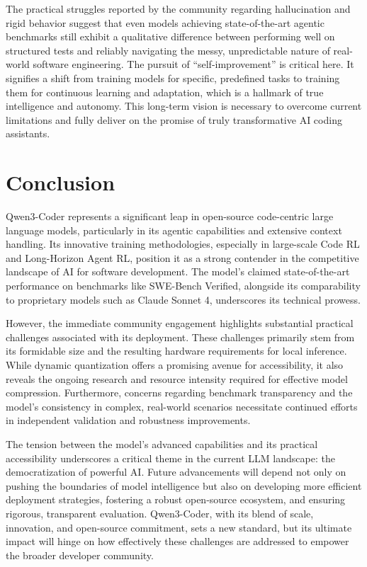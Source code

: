 The practical struggles reported by the community regarding hallucination and rigid behavior suggest that even models achieving state-of-the-art agentic benchmarks still exhibit a qualitative difference between performing well on structured tests and reliably navigating the messy, unpredictable nature of real-world software engineering.\cite{reddit_localllama_qwen3coder_1_2025, reddit_localllama_kimi_qwen3coder_2025} The pursuit of ``self-improvement'' is critical here.\cite{qwenlm_qwen3coder_blog_2025} It signifies a shift from training models for specific, predefined tasks to training them for continuous learning and adaptation, which is a hallmark of true intelligence and autonomy. This long-term vision is necessary to overcome current limitations and fully deliver on the promise of truly transformative AI coding assistants.

\section{Conclusion}

Qwen3-Coder represents a significant leap in open-source code-centric large language models, particularly in its agentic capabilities and extensive context handling. Its innovative training methodologies, especially in large-scale Code RL and Long-Horizon Agent RL, position it as a strong contender in the competitive landscape of AI for software development. The model's claimed state-of-the-art performance on benchmarks like SWE-Bench Verified, alongside its comparability to proprietary models such as Claude Sonnet 4, underscores its technical prowess.

However, the immediate community engagement highlights substantial practical challenges associated with its deployment. These challenges primarily stem from its formidable size and the resulting hardware requirements for local inference. While dynamic quantization offers a promising avenue for accessibility, it also reveals the ongoing research and resource intensity required for effective model compression. Furthermore, concerns regarding benchmark transparency and the model's consistency in complex, real-world scenarios necessitate continued efforts in independent validation and robustness improvements.

The tension between the model's advanced capabilities and its practical accessibility underscores a critical theme in the current LLM landscape: the democratization of powerful AI. Future advancements will depend not only on pushing the boundaries of model intelligence but also on developing more efficient deployment strategies, fostering a robust open-source ecosystem, and ensuring rigorous, transparent evaluation. Qwen3-Coder, with its blend of scale, innovation, and open-source commitment, sets a new standard, but its ultimate impact will hinge on how effectively these challenges are addressed to empower the broader developer community.




\printbibliography

